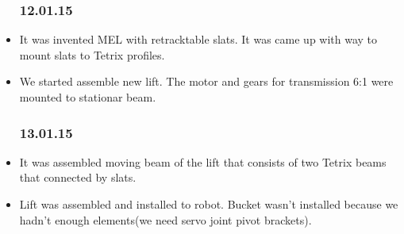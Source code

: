 \begin{itemize}
\begin{enumerate}
		\end{enumerate} 	
		
	\subsubsection{12.01.15}
		\item It was invented MEL with retracktable slats. It was came up with way to mount slats to Tetrix profiles.
		
		\item We started assemble new lift. The motor and gears for transmission 6:1 were mounted to stationar beam.
	\subsubsection{13.01.15}
		\item It was assembled moving beam of the lift that consists of two Tetrix beams that connected by slats.
		
		\item Lift was assembled and installed to robot. Bucket wasn't installed because we hadn't enough elements(we need servo joint pivot brackets).
		

\end{itemize}
